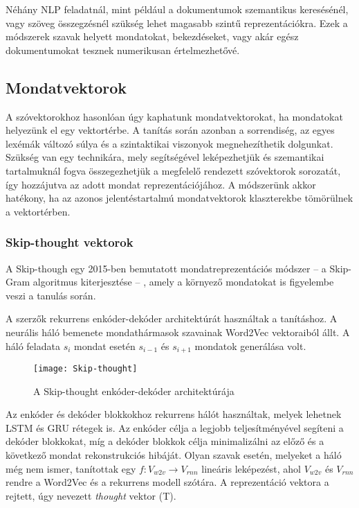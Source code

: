 Néhány NLP feladatnál, mint például a dokumentumok szemantikus keresésénél, vagy szöveg összegzésnél szükség lehet magasabb szintű reprezentációkra.  Ezek a módszerek szavak helyett mondatokat, bekezdéseket, vagy akár egész dokumentumokat tesznek numerikusan értelmezhetővé. 

\subsection{Mondatvektorok}
A szóvektorokhoz hasonlóan úgy kaphatunk mondatvektorokat, ha mondatokat helyezünk el egy vektortérbe. A tanítás során azonban a sorrendiség, az egyes lexémák változó súlya és a szintaktikai viszonyok megnehezíthetik dolgunkat. Szükség van egy technikára, mely segítségével leképezhetjük és szemantikai tartalmuknál fogva összegezhetjük a megfelelő rendezett szóvektorok sorozatát, így hozzájutva az adott mondat reprezentációjához. A módszerünk akkor hatékony, ha az azonos jelentéstartalmú mondatvektorok klaszterekbe tömörülnek a vektortérben.

\subsubsection{Skip-thought vektorok}
A Skip-though \cite{skip} egy 2015-ben bemutatott mondatreprezentációs módszer – a Skip-Gram algoritmus kiterjesztése – , amely a környező mondatokat is figyelembe veszi a tanulás során. 

A szerzők rekurrens enkóder-dekóder architektúrát használtak a tanításhoz. A neurális háló bemenete mondathármasok szavainak Word2Vec vektoraiból állt. A háló feladata $s_i$ mondat esetén $s_{i-1}$ és $s_{i+1}$ mondatok generálása volt.

\begin{figure}[H]
	\centering
	\texttt{[image: Skip-thought]}
	\caption{A Skip-thought enkóder-dekóder architektúrája}
\end{figure}

Az enkóder és dekóder blokkokhoz rekurrens hálót használtak, melyek lehetnek LSTM és GRU rétegek is. Az enkóder célja a legjobb teljesítményével segíteni a dekóder blokkokat, míg a dekóder blokkok célja minimalizálni az előző és a következő mondat rekonstrukciós hibáját. Olyan szavak esetén, melyeket a háló még nem ismer, tanítottak egy $f:V_{w2v} \rightarrow V_{rnn}$ lineáris leképezést, ahol $V_{w2v}$ és $V_{rnn}$ rendre a Word2Vec és a rekurrens modell szótára. A reprezentáció vektora a rejtett, úgy nevezett \textit{thought} vektor (T).

